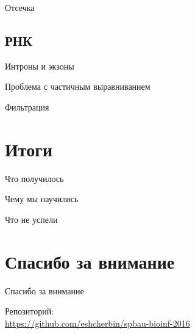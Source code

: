 \documentclass{beamer}
\begin{document}
\begin{frame}[t]{Отсечка}
\end{frame}

\subsection{РНК}

\begin{frame}[t]{Интроны и экзоны}
\end{frame}

\begin{frame}[t]{Проблема с частичным выравниванием}
\end{frame}

\begin{frame}[t]{Фильтрация}
\end{frame}

\section{Итоги}
\begin{frame}[t]{Что получилось}
\end{frame}

\begin{frame}[t]{Чему мы научились}
\end{frame}

\begin{frame}[t]{Что не успели}
\end{frame}

\section{Спасибо за внимание}
\begin{frame}{Спасибо за внимание}
    \begin{center}
        Репозиторий: \\ \url{https://github.com/eshcherbin/spbau-bioinf-2016}
    \end{center}
\end{frame}
\end{document}
